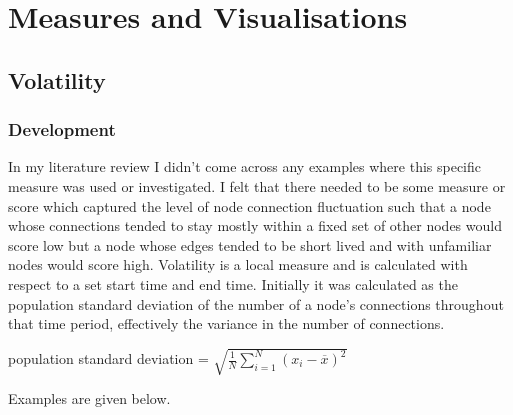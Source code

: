 \section{Measures and Visualisations}



\subsection{Volatility}

\subsubsection{Development}
In my literature review I didn’t come across any examples where this specific measure was used or investigated. I felt that there needed to be some measure or score which captured the level of node connection fluctuation such that a node whose connections tended to stay mostly within a fixed set of other nodes would score low but a node whose edges tended to be short lived and with unfamiliar nodes would score high.
Volatility is a local measure and is calculated with respect to a set start time and end time. Initially it was calculated as the population standard deviation of the number of a node’s connections throughout that time period, effectively the variance in the number of connections.

\begin{center}
population standard deviation = $\sqrt{\frac{1}{N} \sum_{i=1}^N (x_i - \overline{x})^2}$
\end{center}

Examples are given below.


